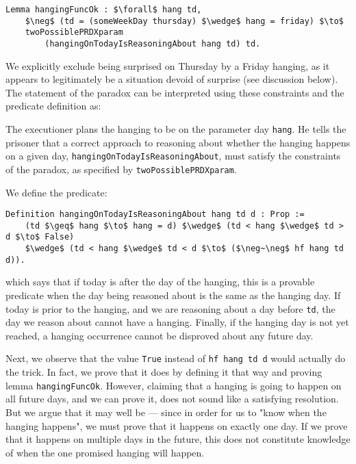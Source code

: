 \documentclass[runningheads]{llncs}
\newenvironment{myindent}{\begin{adjustwidth}{1cm}{}}{\end{adjustwidth}}
\begin{document}
\begin{lstlisting}[mathescape=true]
Lemma hangingFuncOk : $\forall$ hang td,
    $\neg$ (td = (someWeekDay thursday) $\wedge$ hang = friday) $\to$
    twoPossiblePRDXparam
        (hangingOnTodayIsReasoningAbout hang td) td.
\end{lstlisting}

We explicitly exclude being surprised
on Thursday by a Friday hanging, as it appears to legitimately be a situation devoid
of surprise (see discussion below).
The statement of the paradox can be interpreted using these constraints and
the predicate definition as:

\begin{myindent}
  The executioner plans the hanging to be on the parameter
  day {\tt hang}. He tells the prisoner that a correct approach to reasoning about
  whether the hanging happens on a given day, {\tt hangingOnTodayIsReasoningAbout},
  must satisfy the constraints of the paradox, as specified by {\tt twoPossiblePRDXparam}.
\end{myindent}

We define the predicate:

\begin{lstlisting}[mathescape=true]
  Definition hangingOnTodayIsReasoningAbout hang td d : Prop :=
    (td $\geq$ hang $\to$ hang = d) $\wedge$ (td < hang $\wedge$ td > d $\to$ False)
    $\wedge$ (td < hang $\wedge$ td < d $\to$ ($\neg~\neg$ hf hang td d)).
\end{lstlisting}

which says that if today is after the day of the hanging, this is a provable predicate when the
day being reasoned about is the same as the hanging day. If today is prior to the hanging, and
we are reasoning about a day before {\tt td}, the day we reason about cannot have a hanging.
Finally, if the hanging day is not
yet reached, a hanging occurrence cannot be disproved about any future day.

Next, we observe that the value {\tt True} instead of {\tt hf hang td d} would
actually do the trick. In fact, we prove that it does by defining it that
way and proving lemma {\tt hangingFuncOk}. However, claiming that a hanging is going to happen
on all future days, and we can prove it, does not sound like a satisfying
resolution. But we argue that it may well be --- since in order for us to
"know when the hanging happens", we must prove that it happens on exactly one day.
If we prove that it happens on multiple days in the future, this does not
constitute knowledge of when the one promised hanging will happen.
\end{document}
